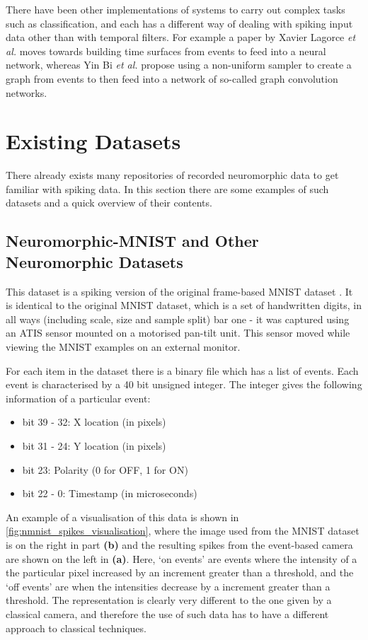 There have been other implementations of systems to carry out complex tasks such as classification, and each has a different way of dealing with spiking input data other than with temporal filters. For example a paper by Xavier Lagorce \textit{et al.}\cite{eventsToTimeSurfaces} moves towards building time surfaces from events to feed into a neural network, whereas Yin Bi \textit{et al.}\cite{eventsToGraphs} propose using a non-uniform sampler to create a graph from events to then feed into a network of so-called graph convolution networks.

\section{Existing Datasets} \label{sec:existing_datasets}

There already exists many repositories of recorded neuromorphic data to get familiar with spiking data. In this section there are some examples of such datasets and a quick overview of their contents.

\subsection{Neuromorphic-MNIST and Other Neuromorphic Datasets} \label{ssec:neuromorphic_datasets}

This dataset is a spiking version of the original frame-based MNIST dataset \cite{MNIST}\cite{NMNIST}. It is identical to the original MNIST dataset, which is a set of handwritten digits, in all ways (including scale, size and sample split) bar one - it was captured using an ATIS sensor mounted on a motorised pan-tilt unit. This sensor moved while viewing the MNIST examples on an external monitor.

For each item in the dataset there is a binary file which has a list of events. Each event is characterised by a 40 bit unsigned integer. The integer gives the following information of a particular event:

\begin{itemize}
      \item bit 39 - 32: X location (in pixels)
      \item bit 31 - 24: Y location (in pixels)
      \item bit 23: Polarity (0 for OFF, 1 for ON)
      \item bit 22 - 0: Timestamp (in microseconds)
\end{itemize}

An example of a visualisation of this data is shown in \autoref{fig:nmnist_spikes_visualisation}, where the image used from the MNIST dataset is on the right in part \textbf{(b)} and the resulting spikes from the event-based camera are shown on the left in \textbf{(a)}. Here, `on events' are events where the intensity of a the particular pixel increased by an increment greater than a threshold, and the `off events' are when the intensities decrease by a increment greater than a threshold. The representation is clearly very different to the one given by a classical camera, and therefore the use of such data has to have a different approach to classical techniques.

